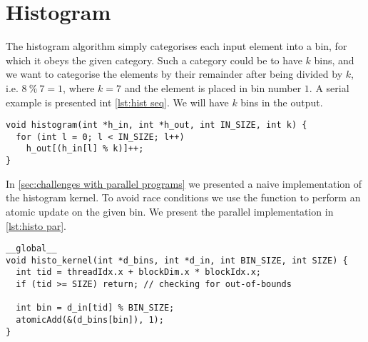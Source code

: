 \section{Histogram}
\label{sec:histogram}

The histogram algorithm simply categorises each input element into a bin, for which it obeys the given category.
Such a category could be to have $k$ bins, and we want to categorise the elements by their remainder after being divided by $k$, i.e. $8\ \%\ 7 = 1$, where $k = 7$ and the element is placed in bin number $1$.
A serial example is presented int \cref{lst:hist seq}.
We will have $k$ bins in the output.

\begin{lstlisting}[caption={Serial histogram}, label={lst:hist seq}]
void histogram(int *h_in, int *h_out, int IN_SIZE, int k) {
  for (int l = 0; l < IN_SIZE; l++) 
    h_out[(h_in[l] % k)]++;
}
\end{lstlisting}

In \cref{sec:challenges with parallel programs} we presented a naive implementation of the histogram kernel.
To avoid race conditions we use the  function to perform an atomic update on the given bin.
We present the parallel implementation in \cref{lst:histo par}.

\begin{lstlisting}[caption={Simple parallel histogram implementation}, label={lst:histo par}]
__global__ 
void histo_kernel(int *d_bins, int *d_in, int BIN_SIZE, int SIZE) {
  int tid = threadIdx.x + blockDim.x * blockIdx.x;
  if (tid >= SIZE) return; // checking for out-of-bounds

  int bin = d_in[tid] % BIN_SIZE;
  atomicAdd(&(d_bins[bin]), 1);
}
\end{lstlisting}

